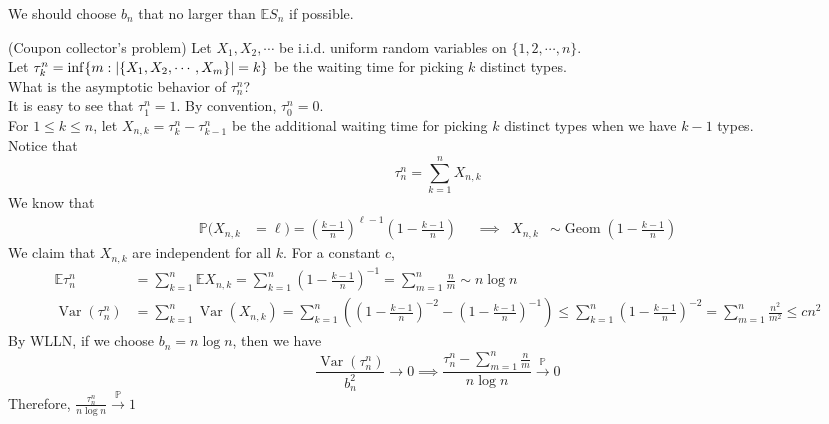 \documentclass{huhtakm-template-book}
\newcommand{\prob}{\mathbb{P}}
\newcommand{\expect}{\mathbb{E}}
\DeclareMathOperator{\Geom}{Geom}
\DeclareMathOperator{\Var}{Var}
\begin{document}
\begin{rem}
	We should choose $b_{n}$ that no larger than $\expect S_{n}$ if possible.
\end{rem}
\begin{eg}(Coupon collector's problem) 
	Let $X_{1},X_{2},\cdots$ be i.i.d. uniform random variables on $\{1,2,\cdots,n\}$.\\
	Let $\tau_{k}^{n}=\inf\{m:\left|{\{X_{1},X_{2},\cdots,X_{m}\}}\right|=k\}$ be the waiting time for picking $k$ distinct types.\\
	What is the asymptotic behavior of $\tau_{n}^{n}$?\\
	It is easy to see that $\tau_{1}^{n}=1$. By convention, $\tau_{0}^{n}=0$.\\
	For $1\leq k\leq n$, let $X_{n,k}=\tau_{k}^{n}-\tau_{k-1}^{n}$ be the additional waiting time for picking $k$ distinct types when we have $k-1$ types.\\
	Notice that
	\begin{equation*}
		\tau_{n}^{n}=\sum_{k=1}^{n}X_{n,k}
	\end{equation*}
	We know that
	\begin{align*}
		\prob(X_{n,k}&=\ell)=\left(\frac{k-1}{n}\right)^{\ell-1}\left(1-\frac{k-1}{n}\right) & &\implies & X_{n,k}&\sim\Geom\left(1-\frac{k-1}{n}\right)
	\end{align*}
	We claim that $X_{n,k}$ are independent for all $k$. For a constant $c$,
	\begin{align*}
		\expect\tau_{n}^{n}&=\sum_{k=1}^{n}\expect X_{n,k}=\sum_{k=1}^{n}\left(1-\frac{k-1}{n}\right)^{-1}=\sum_{m=1}^{n}\frac{n}{m}\sim n\log n\\
		\Var(\tau_{n}^{n})&=\sum_{k=1}^{n}\Var(X_{n,k})=\sum_{k=1}^{n}\left(\left(1-\frac{k-1}{n}\right)^{-2}-\left(1-\frac{k-1}{n}\right)^{-1}\right)\leq\sum_{k=1}^{n}\left(1-\frac{k-1}{n}\right)^{-2}=\sum_{m=1}^{n}\frac{n^{2}}{m^{2}}\leq cn^{2}
	\end{align*}
	By WLLN, if we choose $b_{n}=n\log n$, then we have
	\begin{equation*}
		\frac{\Var(\tau_{n}^{n})}{b_{n}^{2}}\to 0\implies\frac{\tau_{n}^{n}-\sum_{m=1}^{n}\frac{n}{m}}{n\log n}\xrightarrow{\prob}0
	\end{equation*}
	Therefore, $\frac{\tau_{n}^{n}}{n\log n}\xrightarrow{\prob}1$
\end{eg}
\end{document}
